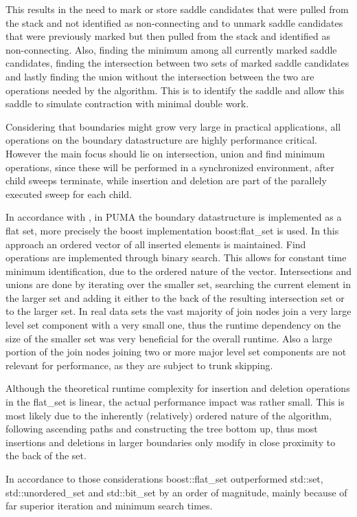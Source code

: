 \documentclass[%
	paper=A4,					%
	twoside=true,				%
	openright,					%
	parskip=full,				%
	chapterprefix=true,			%
	11pt,						%
	headings=normal,			%
	bibliography=totoc,			%
	listof=totoc,				%
	titlepage=on,				%
	captions=tableabove,		%
	draft=false,				%
]{scrreprt}%
\begin{document}
This results in the need to mark or store saddle candidates that were pulled from the stack and not identified as non-connecting and to unmark saddle candidates that were previously marked but then pulled from the stack and identified as non-connecting. Also, finding the minimum among all currently marked saddle candidates, finding the intersection between two sets of marked saddle candidates and lastly finding the union without the intersection between the two are operations needed by the algorithm. This is to identify the saddle and allow this saddle to simulate contraction with minimal double work.

Considering that boundaries might grow very large in practical applications, all operations on the boundary datastructure are highly performance critical. However the main focus should lie on intersection, union and find minimum operations, since these will be performed in a synchronized environment, after child sweeps terminate, while insertion and deletion are part of the parallely executed sweep for each child. 

In accordance with \cite{flatset}, in PUMA the boundary datastructure is implemented as a flat set, more precisely the boost implementation boost:flat\_set is used. In this approach an ordered vector of all inserted elements is maintained. Find operations are implemented through binary search. This allows for constant time minimum identification, due to the ordered nature of the vector. Intersections and unions are done by iterating over the smaller set, searching the current element in the larger set and adding it either to the back of the resulting intersection set or to the larger set. In real data sets the vast majority of join nodes join a very large level set component with a very small one, thus the runtime dependency on the size of the smaller set was very beneficial for the overall runtime. Also a large portion of the join nodes joining two or more major level set components are not relevant for performance, as they are subject to trunk skipping.

Although the theoretical runtime complexity for insertion and deletion operations in the flat\_set is linear, the actual performance impact was rather small. This is most likely due to the inherently (relatively) ordered nature of the algorithm, following ascending paths and constructing the tree bottom up, thus most insertions and deletions in larger boundaries only modify in close proximity to the back of the set. 

In accordance to those considerations boost::flat\_set outperformed std::set, std::unordered\_set and std::bit\_set by an order of magnitude, mainly because of far superior iteration and minimum search times. 
\end{document}
